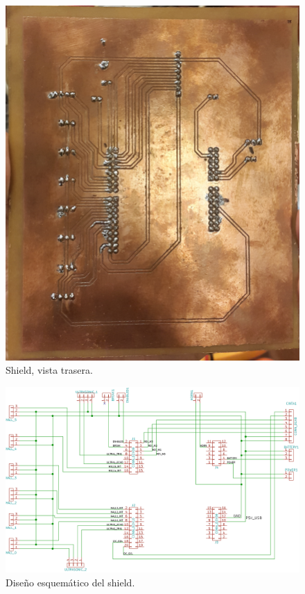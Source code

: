 \documentclass[withindex,glossary]{cam-thesis}
\begin{document}
\begin{figure}[H]
\begin{minipage}[t]{0.4\textwidth}
    \includegraphics[width=\textwidth]{images/Shield_Back}
    \caption[Shield, vista trasera]{Shield, vista trasera.}
    \label{fig:ShieldBack}
  \end{minipage}
\end{figure}

\begin{figure}[H]
  \centering
  \begin{minipage}[b]{0.49\textwidth}
    \includegraphics[width=\textwidth]{images/Shield_Schematic}
    \caption[Diseño esquemático del shield]{Diseño esquemático del shield.}
    \label{fig:ShieldSchematic}
  \end{minipage}
\end{figure}
\end{document}
